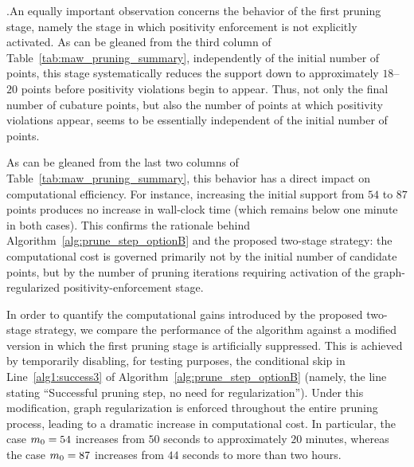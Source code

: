 \documentclass[11pt,a4paper]{article}
\begin{document}
%
 .An equally important observation concerns the behavior of the first pruning stage, namely the stage in which positivity enforcement is not explicitly activated.  As can be gleaned from the third column of Table~\ref{tab:maw_pruning_summary}, independently of the initial number of points, this stage systematically reduces the support down to approximately $18$--$20$ points before positivity violations begin to appear. Thus, not only the final number of cubature points, but also the number of points at which positivity violations appear, seems to be essentially independent of the initial number of points.

As can be gleaned from the  last two columns of Table~\ref{tab:maw_pruning_summary}, this behavior has a direct impact on computational efficiency. For instance,   increasing the initial support from $54$ to $87$ points produces   no increase in wall-clock time (which remains below one minute in both cases). This confirms the rationale behind Algorithm~\ref{alg:prune_step_optionB} and the proposed two-stage strategy: the computational cost is governed primarily not by the initial number of candidate points, but by the number of pruning iterations requiring activation of the graph-regularized positivity-enforcement stage.

In order to quantify the computational gains introduced by the proposed two-stage strategy, we compare the performance of the algorithm against a modified version in which the first pruning stage is artificially suppressed. This is achieved by temporarily disabling, for testing purposes, the conditional skip in Line~\ref{alg1:success3} of Algorithm~\ref{alg:prune_step_optionB} (namely, the line stating ``Successful pruning step, no need for regularization''). Under this modification, graph regularization is enforced throughout the entire pruning process, leading to a dramatic increase in computational cost.  In particular, the case $m_0 = 54$ increases from   $50$ seconds to approximately $20$ minutes, whereas the case $m_0 = 87$ increases from   $44$ seconds to more than two hours.
\end{document}
